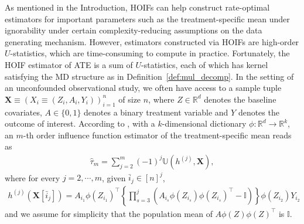 \documentclass[sn-mathphys, natbib=false]{sn-jnl}
\theoremstyle{plain}
\theoremstyle{definition}
\newcommand{\ustat}{\mathbb{U}}
\newcommand{\bbR}{{\mathbb{R}}}
\begin{document}
\begin{bibunit}[agsm]
As mentioned in the Introduction, HOIFs \citep{robins2008higher} can help construct rate-optimal estimators for important parameters such as the treatment-specific mean under ignorability under certain complexity-reducing assumptions on the data generating mechanism. However, estimators constructed via HOIFs are high-order $U$-statistics, which are time-consuming to compute in practice. Fortunately, the HOIF estimator of ATE is a sum of $U$-statistics, each of which has kernel satisfying the MD structure as in Definition~\ref{def:mul_decomp}. 
In the setting of an unconfounded observational study, we often have access to a sample tuple $\bm{X} \equiv (X_{i} \equiv (Z_{i}, A_{i}, Y_{i}))_{i = 1}^{n}$ of size $n$, where $Z \in \bbR^{d}$ denotes the baseline covariates, $A \in \{0, 1\}$ denotes a binary treatment variable and $Y$ denotes the outcome of interest. According to \citet{robins2008higher}, with a $k$-dimensional dictionary $\phi: \bbR^{d} \rightarrow \bbR^{k}$, an $m$-th order influence function estimator of the treatment-specific mean reads as
\begin{align*}
 \hat{\tau}_{m} = \sum_{j = 2}^{m} (-1)^{j} \ustat (h^{(j)}, \bm{X}), 
\end{align*}
where for every $j = 2, \cdots, m$, given $\bar{i}_{j} \in [n]^j$,
\begin{align*}
 h^{(j)} (\bm{X}[\bar{i}_{j}]) = A_{i_{1}} \phi (Z_{i_{1}})^{\top} \left\{ \prod_{s = 3}^{j} \left( A_{i_{s}} \phi (Z_{i_{s}}) \phi (Z_{i_{s}})^{\top} - \mathbb{I} \right) \right\} \phi (Z_{i_{2}}) Y_{i_{2}}
\end{align*}
and we assume for simplicity that the population mean of $A \phi (Z) \phi (Z)^{\top}$ is $\mathbb{I}$.


\end{bibunit}
\end{document}
